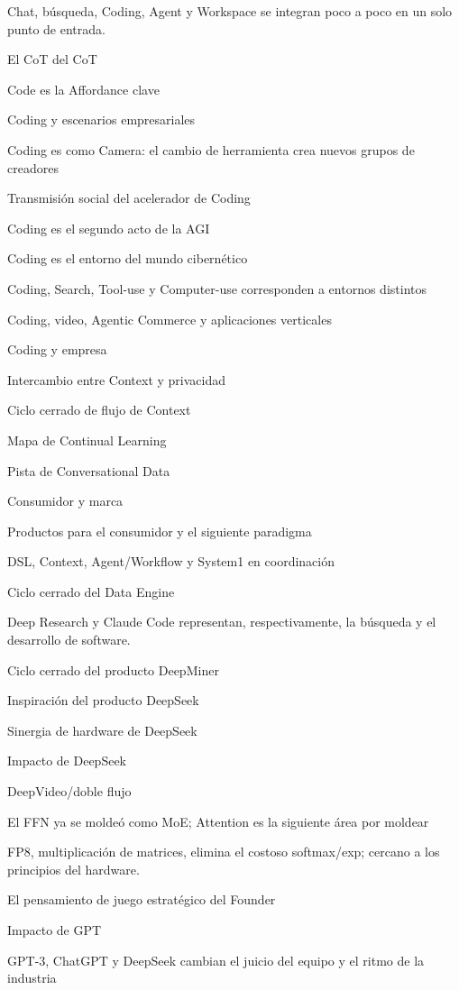 \documentclass{article}
\begin{document}
Chat, búsqueda, Coding, Agent y Workspace se integran poco a poco en un solo punto de entrada.

El CoT del CoT

Code es la Affordance clave

Coding y escenarios empresariales

Coding es como Camera: el cambio de herramienta crea nuevos grupos de creadores

Transmisión social del acelerador de Coding

Coding es el segundo acto de la AGI

Coding es el entorno del mundo cibernético

Coding, Search, Tool-use y Computer-use corresponden a entornos distintos

Coding, video, Agentic Commerce y aplicaciones verticales

Coding y empresa

Intercambio entre Context y privacidad

Ciclo cerrado de flujo de Context

Mapa de Continual Learning

Pista de Conversational Data

Consumidor y marca

Productos para el consumidor y el siguiente paradigma

DSL, Context, Agent/Workflow y System1 en coordinación

Ciclo cerrado del Data Engine

Deep Research y Claude Code representan, respectivamente, la búsqueda y el desarrollo de software.

Ciclo cerrado del producto DeepMiner

Inspiración del producto DeepSeek

Sinergia de hardware de DeepSeek

Impacto de DeepSeek

DeepVideo/doble flujo

El FFN ya se moldeó como MoE; Attention es la siguiente área por moldear

FP8, multiplicación de matrices, elimina el costoso softmax/exp; cercano a los principios del hardware.

El pensamiento de juego estratégico del Founder

Impacto de GPT

GPT-3, ChatGPT y DeepSeek cambian el juicio del equipo y el ritmo de la industria
\end{document}
